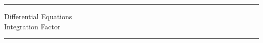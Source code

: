 \documentclass[12pt]{amsart}
\newcommand{\BACKROOT}{../../../..}
\newcommand{\TEACHINGROOT}{\BACKROOT}
\newcommand{\PATHTOHEADERS}{\TEACHINGROOT/Headers}
\numberwithin{equation}{section}
\begin{document}


\pagestyle{empty}

\noindent\rule{7.6in}{0.4pt}

{\centering\sc 
\noindent Differential Equations\\
 Integration Factor \\
}
\noindent\rule{7.6in}{0.4pt}

\vspace{0.1cm}

%
%
%
%
%	
%
%	
%	
%
%		
%
%	
\end{document}
